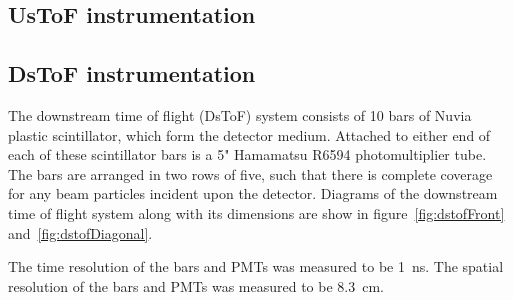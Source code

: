 	\subsection{UsToF instrumentation}

	\subsection{DsToF instrumentation}
	
    The downstream time of flight (DsToF) system consists of 10 bars of Nuvia plastic scintillator, which form the detector medium. Attached to either end of each of these scintillator bars is a 5" Hamamatsu R6594 photomultiplier tube. The bars are arranged in two rows of five, such that there is complete coverage for any beam particles incident upon the detector. Diagrams of the downstream time of flight system along with its dimensions are show in figure~\ref{fig:dstofFront} and~\ref{fig:dstofDiagonal}.
    
    The time resolution of the bars and PMTs was measured to be 1~ns. The spatial resolution of the bars and PMTs was measured to be 8.3~cm.
    
